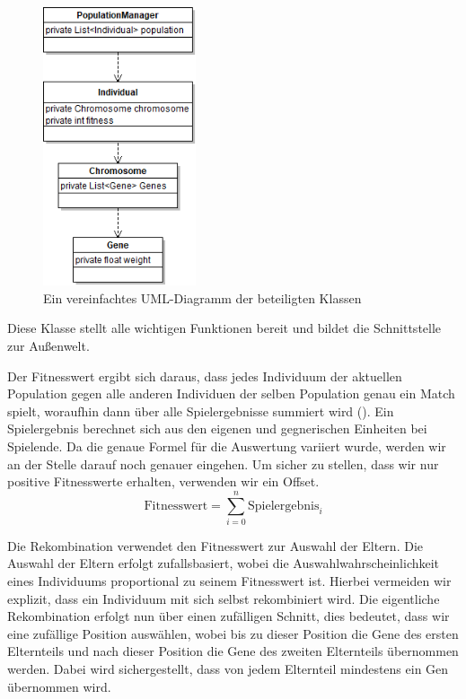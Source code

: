 \documentclass[
	12pt,
	a4paper,
	BCOR10mm,
	DIV14,
	headsepline,
	usegeometry,
]{scrreprt}
\begin{document}
\begin{figure}[h!]
	\centering
	\includegraphics[width = 0.4\textwidth]{ClassDiagrammGeneticAlgorithm.png}
	\caption{Ein vereinfachtes UML-Diagramm der beteiligten Klassen}
	\label{ClassDiagramm}
\end{figure}

Diese Klasse stellt alle wichtigen Funktionen bereit und bildet die Schnittstelle zur Außenwelt.

Der Fitnesswert ergibt sich daraus, dass jedes Individuum der aktuellen Population gegen alle anderen Individuen der selben Population genau ein Match spielt, woraufhin dann über alle Spielergebnisse summiert wird ().
Ein Spielergebnis berechnet sich aus den eigenen und gegnerischen Einheiten bei Spielende.
Da die genaue Formel für die Auswertung variiert wurde, werden wir an der Stelle darauf noch genauer eingehen.
Um sicher zu stellen, dass wir nur positive Fitnesswerte erhalten, verwenden wir ein Offset.
\begin{equation}\label{eq:fitness}
	\text{Fitnesswert} = \sum_{i=0}^n{\text{Spielergebnis}_{i}}
\end{equation}

Die Rekombination verwendet den Fitnesswert zur Auswahl der Eltern.
Die Auswahl der Eltern erfolgt zufallsbasiert, wobei die Auswahlwahrscheinlichkeit eines Individuums proportional zu seinem Fitnesswert ist.
Hierbei vermeiden wir explizit, dass ein Individuum mit sich selbst rekombiniert wird.
Die eigentliche Rekombination erfolgt nun über einen zufälligen Schnitt, dies bedeutet, dass wir eine zufällige Position auswählen, wobei bis zu dieser Position die Gene des ersten Elternteils und nach dieser Position die Gene des zweiten Elternteils übernommen werden.
Dabei wird sichergestellt, dass von jedem Elternteil mindestens ein Gen übernommen wird.
\end{document}
